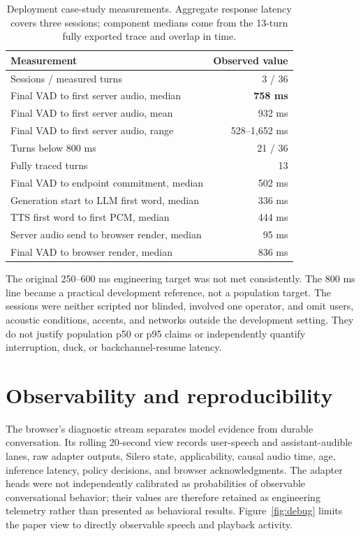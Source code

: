\documentclass[10pt,twocolumn]{article}
\begin{document}
\begin{table}[H]
\centering
\caption{Deployment case-study measurements. Aggregate response latency covers three sessions;
component medians come from the 13-turn fully exported trace and overlap in time.}
\begin{tabularx}{\columnwidth}{Xr}
\toprule
Measurement & Observed value \\
\midrule
Sessions / measured turns & 3 / 36 \\
Final VAD to first server audio, median & \textbf{758 ms} \\
Final VAD to first server audio, mean & 932 ms \\
Final VAD to first server audio, range & 528--1,652 ms \\
Turns below 800 ms & 21 / 36 \\
Fully traced turns & 13 \\
Final VAD to endpoint commitment, median & 502 ms \\
Generation start to LLM first word, median & 336 ms \\
TTS first word to first PCM, median & 444 ms \\
Server audio send to browser render, median & 95 ms \\
Final VAD to browser render, median & 836 ms \\
\bottomrule
\end{tabularx}
\label{tab:latency}
\end{table}

The original 250--600 ms engineering target was not met consistently. The 800 ms line became a
practical development reference, not a population target. The sessions were neither scripted nor
blinded, involved one operator, and omit users, acoustic conditions, accents, and networks outside
the development setting. They do not justify population p50 or p95 claims or independently quantify
interruption, duck, or backchannel-resume latency.

\section{Observability and reproducibility}

The browser's diagnostic stream separates model evidence from durable conversation. Its rolling
20-second view records user-speech and assistant-audible lanes, raw adapter outputs, Silero state,
applicability, causal audio time, age, inference latency, policy decisions, and browser
acknowledgments. The adapter heads were not independently calibrated as probabilities of observable
conversational behavior; their values are therefore retained as engineering telemetry rather than
presented as behavioral results. Figure~\ref{fig:debug} limits the paper view to directly observable
speech and playback activity.
\end{document}

